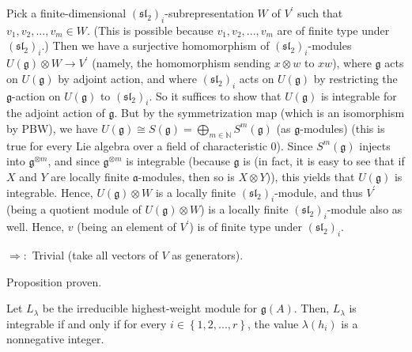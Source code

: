 \documentclass[etingof-lie.tex]{subfiles}
\begin{document}
Pick a finite-dimensional $\left(  \mathfrak{sl}_{2}\right)  _{i}%
$-subrepresentation $W$ of $V^{\prime}$ such that $v_{1},v_{2},...,v_{m}\in
W$. (This is possible because $v_{1},v_{2},...,v_{m}$ are of finite type under
$\left(  \mathfrak{sl}_{2}\right)  _{i}$.) Then we have a surjective
homomorphism of $\left(  \mathfrak{sl}_{2}\right)  _{i}$-modules $U\left(
\mathfrak{g}\right)  \otimes W\rightarrow V^{\prime}$ (namely, the
homomorphism sending $x\otimes w$ to $xw$), where $\mathfrak{g}$ acts on
$U\left(  \mathfrak{g}\right)  $ by adjoint action, and where $\left(
\mathfrak{sl}_{2}\right)  _{i}$ acts on $U\left(  \mathfrak{g}\right)  $ by
restricting the $\mathfrak{g}$-action on $U\left(  \mathfrak{g}\right)  $ to
$\left(  \mathfrak{sl}_{2}\right)  _{i}$. So it suffices to show that
$U\left(  \mathfrak{g}\right)  $ is integrable for the adjoint action of
$\mathfrak{g}$. But by the symmetrization map (which is an isomorphism by
PBW), we have $U\left(  \mathfrak{g}\right)  \cong S\left(  \mathfrak{g}%
\right)  =\bigoplus\limits_{m\in\mathbb{N}}S^{m}\left(  \mathfrak{g}\right)  $
(as $\mathfrak{g}$-modules) (this is true for every Lie algebra over a field
of characteristic $0$). Since $S^{m}\left(  \mathfrak{g}\right)  $ injects
into $\mathfrak{g}^{\otimes m}$, and since $\mathfrak{g}^{\otimes m}$ is
integrable (because $\mathfrak{g}$ is (in fact, it is easy to see that if $X$
and $Y$ are locally finite $\mathfrak{a}$-modules, then so is $X\otimes Y$)),
this yields that $U\left(  \mathfrak{g}\right)  $ is integrable. Hence,
$U\left(  \mathfrak{g}\right)  \otimes W$ is a locally finite $\left(
\mathfrak{sl}_{2}\right)  _{i}$-module, and thus $V^{\prime}$ (being a
quotient module of $U\left(  \mathfrak{g}\right)  \otimes W$) is a locally
finite $\left(  \mathfrak{sl}_{2}\right)  _{i}$-module also as well. Hence,
$v$ (being an element of $V^{\prime}$) is of finite type under $\left(
\mathfrak{sl}_{2}\right)  _{i}$.

$\Longrightarrow:$ Trivial (take all vectors of $V$ as generators).

Proposition proven.

\begin{corollary}
Let $L_{\lambda}$ be the irreducible highest-weight module for $\mathfrak{g}%
\left(  A\right)  $. Then, $L_{\lambda}$ is integrable if and only if for
every $i\in\left\{  1,2,...,r\right\}  $, the value $\lambda\left(
h_{i}\right)  $ is a nonnegative integer.
\end{corollary}
\end{document}
